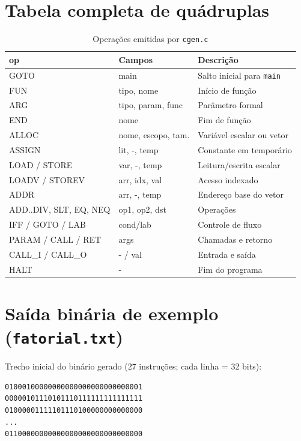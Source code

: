 \documentclass[
	12pt,				%
	openright,			%
	a4paper,			%
	english,			%
	french,				%
	spanish,			%
	brazil,				%
	]{abntex2}
\begin{document}
\begin{apendicesenv}

\chapter{Tabela completa de quádruplas}

\begin{table}[H]
\centering
\caption{Operações emitidas por \texttt{cgen.c}}
\label{tab:apendice-quadruplas}
\small
\begin{tabular}{|l|l|p{7cm}|}
\hline
\textbf{op} & \textbf{Campos} & \textbf{Descrição} \\
\hline
GOTO & main & Salto inicial para \texttt{main} \\
FUN & tipo, nome & Início de função \\
ARG & tipo, param, func & Parâmetro formal \\
END & nome & Fim de função \\
ALLOC & nome, escopo, tam. & Variável escalar ou vetor \\
ASSIGN & lit, -, temp & Constante em temporário \\
LOAD / STORE & var, -, temp & Leitura/escrita escalar \\
LOADV / STOREV & arr, idx, val & Acesso indexado \\
ADDR & arr, -, temp & Endereço base do vetor \\
ADD..DIV, SLT, EQ, NEQ & op1, op2, dst & Operações \\
IFF / GOTO / LAB & cond/lab & Controle de fluxo \\
PARAM / CALL / RET & args & Chamadas e retorno \\
CALL\_I / CALL\_O & - / val & Entrada e saída \\
HALT & - & Fim do programa \\
\hline
\end{tabular}
\end{table}

\chapter{Saída binária de exemplo (\texttt{fatorial.txt})}

Trecho inicial do binário gerado (27 instruções; cada linha = 32 bits):

\begin{verbatim}
01000100000000000000000000000001
00000101110101110111111111111111
01000001111101110100000000000000
...
01100000000000000000000000000000
\end{verbatim}

\end{apendicesenv}



\printindex
\end{document}
